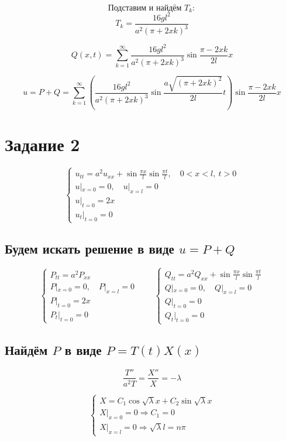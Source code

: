 \documentclass[a4paper,12pt]{article}
\begin{document}
$$\textbf{Подставим и найдём } T_k:$$
$$T_k = \frac{16 g l^2}{a^2 (\pi + 2 x k)^3}$$

$$Q(x, t) = \sum_{k=1}^\infty \frac{16 g l^2}{a^2 (\pi + 2 x k)^3} \sin \frac{\pi - 2 x k}{2 l} x$$

$$u = P + Q = \sum_{k=1}^\infty \left( \frac{16 g l^2}{a^2 (\pi + 2 x k)^3} \sin \frac{a \sqrt{(\pi + 2 x k)^2}}{2 l} t \right) \sin \frac{\pi - 2 x k}{2 l} x$$

\section*{Задание 2}

$$\begin{cases}
u_{tt} = a^2 u_{xx} + \sin \frac{\pi x}{l} \sin \frac{\pi t}{l}, \quad 0 < x < l,\ t > 0 \\
u|_{x=0} = 0, \quad u|_{x=l} = 0 \\
u|_{t=0} = 2x \\
u_t|_{t=0} = 0
\end{cases}$$

\subsection*{Будем искать решение в виде $u = P + Q$}

$$\begin{cases}
P_{tt} = a^2 P_{xx} \\
P|_{x=0} = 0, \quad P|_{x=l} = 0 \\
P|_{t=0} = 2x \\
P_t|_{t=0} = 0
\end{cases}
\qquad
\begin{cases}
Q_{tt} = a^2 Q_{xx} + \sin \frac{\pi x}{l} \sin \frac{\pi t}{l} \\
Q|_{x=0} = 0, \quad Q|_{x=l} = 0 \\
Q|_{t=0} = 0 \\
Q_t|_{t=0} = 0
\end{cases}$$

\subsection*{Найдём $P$ в виде $P = T(t) X(x)$}

$$\frac{T''}{a^2 T} = \frac{X''}{X} = -\lambda$$

$$\begin{cases}
X = C_1 \cos \sqrt{\lambda} x + C_2 \sin \sqrt{\lambda} x \\
X|_{x=0} = 0 \Rightarrow C_1 = 0 \\
X|_{x=l} = 0 \Rightarrow \sqrt{\lambda} l = n \pi
\end{cases}$$
\end{document}
